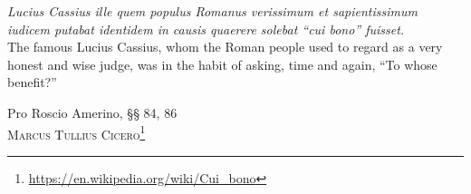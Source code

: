 
\epigraph{\textit{Lucius Cassius ille quem populus Romanus verissimum et sapientissimum iudicem putabat identidem in causis quaerere solebat ``cui bono'' fuisset.\\} \vspace{2ex} The famous Lucius Cassius, whom the Roman people used to regard as a very honest and wise judge, was in the habit of asking, time and again, ``To whose benefit?''}{Pro Roscio Amerino, §§ 84, 86\\
  \vspace{-2ex}\textsc{Marcus Tullius Cicero\footnote{\url{https://en.wikipedia.org/wiki/Cui_bono}}}}

